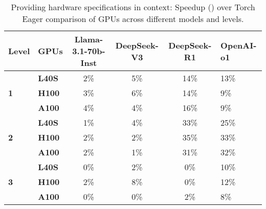 \begin{table}[H]
\centering
\begin{tabular}{llcccl}
\toprule
\textbf{Level} & \textbf{GPUs} & \textbf{Llama-3.1-70b-Inst} & \textbf{DeepSeek-V3} & \textbf{DeepSeek-R1}  & \textbf{OpenAI-o1}\\
\midrule
\multirow{3}{*}{
\textbf{1}}
& \textbf{L40S} & 2\% & 5\% & 14\%  &13\%\\
& \textbf{H100} & 3\% & 6\% & 14\%  &9\%\\
& \textbf{A100} & 4\% & 4\% & 16\%  &9\%\\
\midrule
\multirow{3}{*}{
\textbf{2}}
& \textbf{L40S} & 1\% & 4\% & 33\%  &25\%\\
& \textbf{H100} & 2\% & 2\% & 35\%  &33\%\\
& \textbf{A100} & 2\% & 1\% & 31\%  &32\%\\
\midrule
\multirow{3}{*}{
\textbf{3}}
& \textbf{L40S} & 0\% & 2\% & 0\%  &10\%\\
& \textbf{H100} & 2\% & 8\% & 0\%  &12\%\\
& \textbf{A100} & 0\% & 0\% & 2\%  &8\%\\
\bottomrule
\end{tabular}

\caption{Providing hardware specifications in context: Speedup () over Torch Eager comparison of GPUs across different models and levels.}
\label{tab:speedup-hardware-comparison-prompting}
\end{table}